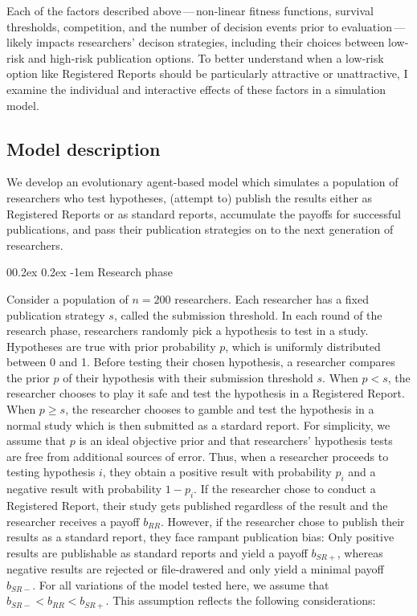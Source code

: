 \documentclass[british,,man,floatsintext]{apa6}
\makeatletter
\renewcommand{\paragraph}{\@startsection{paragraph}{4}{\parindent}%
  {0\baselineskip \@plus 0.2ex \@minus 0.2ex}%
  {-1em}%
  {\normalfont\normalsize\bfseries\itshape\typesectitle}}
\makeatother
\begin{document}
Each of the factors described above\(\,\)---\(\,\)non-linear fitness functions, survival thresholds, competition, and the number of decision events prior to evaluation\(\,\)---\(\,\)likely impacts researchers' decison strategies, including their choices between low-risk and high-risk publication options.
To better understand when a low-risk option like Registered Reports should be particularly attractive or unattractive, I examine the individual and interactive effects of these factors in a simulation model.

\hypertarget{model-description}{%
\subsection{Model description}\label{model-description}}

We develop an evolutionary agent-based model which simulates a population of researchers who test hypotheses, (attempt to) publish the results either as Registered Reports or as standard reports, accumulate the payoffs for successful publications, and pass their publication strategies on to the next generation of researchers.

\hypertarget{research-phase}{%
\paragraph{Research phase}\label{research-phase}}

Consider a population of \(n = 200\) researchers.
Each researcher has a fixed publication strategy \(s\), called the submission threshold.
In each round of the research phase, researchers randomly pick a hypothesis to test in a study.
Hypotheses are true with prior probability \(p\), which is uniformly distributed between 0 and 1.
Before testing their chosen hypothesis, a researcher compares the prior \(p\) of their hypothesis with their submission threshold \(s\).
When \(p < s\), the researcher chooses to play it safe and test the hypothesis in a Registered Report.
When \(p \geq s\), the researcher chooses to gamble and test the hypothesis in a normal study which is then submitted as a stardard report.
For simplicity, we assume that \(p\) is an ideal objective prior and that researchers' hypothesis tests are free from additional sources of error.
Thus, when a researcher proceeds to testing hypothesis \(i\), they obtain a positive result with probability \(p_i\) and a negative result with probability \(1-p_i\).
If the researcher chose to conduct a Registered Report, their study gets published regardless of the result and the researcher receives a payoff \(b_{RR}\).
However, if the researcher chose to publish their results as a standard report, they face rampant publication bias:
Only positive results are publishable as standard reports and yield a payoff \(b_{SR+}\), whereas negative results are rejected or file-drawered and only yield a minimal payoff \(b_{SR-}\).
For all variations of the model tested here, we assume that \(b_{SR-} < b_{RR} < b_{SR+}\).
This assumption reflects the following considerations:
\end{document}
